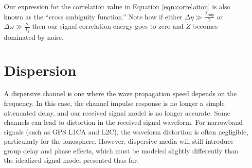 \documentclass{article}
\begin{document}
Our expression for the correlation value in Equation \ref{eqn:correlation} is also known as the ``cross ambiguity function.''  Note how if either $\Delta\eta \gg \frac{T_\text{chip}}{2}$ or $\Delta\omega \gg \frac{2}{T_I}$ then our signal correlation energy goes to zero and $Z$ becomes dominated by noise.


\section{Dispersion}

A dispersive channel is one where the wave propagation speed depends on the frequency.  In this case, the channel impulse response is no longer a simple attenuated delay, and our received signal model is no longer accurate.  Some channels can lead to distortion in the received signal waveform.  For narrowband signals (such as GPS L1CA and L2C), the waveform distortion is often negligible, particularly for the ionosphere.  However, dispersive media will still introduce group delay and phase effects, which must be modeled slightly differently than the idealized signal model presented thus far.
\end{document}
